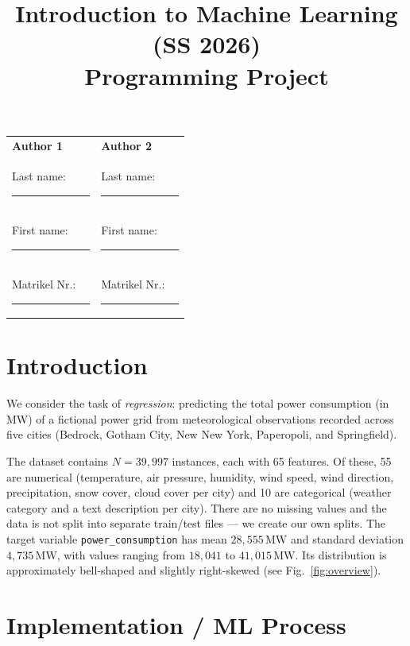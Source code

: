 \documentclass[a4, 10pt, conference]{ieeeconf}
\title{\LARGE \bf
Introduction to Machine Learning (SS 2026)\\ Programming Project
\vspace{-3em}
}
\begin{document}
\maketitle
\vspace{-3em}
\thispagestyle{empty}
\pagestyle{empty}

\begin{center}
\begin{tabular}{|p{0.42\linewidth}|p{0.42\linewidth}|}
\hline
\textbf{Author 1} & \textbf{Author 2} \\
Last name:  \rule{2.2cm}{0.4pt}  & Last name:  \rule{2.2cm}{0.4pt} \\
First name: \rule{2.2cm}{0.4pt}  & First name: \rule{2.2cm}{0.4pt} \\
Matrikel Nr.: \rule{2cm}{0.4pt}  & Matrikel Nr.: \rule{2cm}{0.4pt} \\
\hline
\end{tabular}
\end{center}


\section{Introduction}
\label{sec:intro}

We consider the task of \emph{regression}: predicting the total power consumption (in MW) of a fictional power grid from meteorological observations recorded across five cities (Bedrock, Gotham City, New New York, Paperopoli, and Springfield).

The dataset contains $N = 39{,}997$ instances, each with 65 features. Of these, 55 are numerical (temperature, air pressure, humidity, wind speed, wind direction, precipitation, snow cover, cloud cover per city) and 10 are categorical (weather category and a text description per city). There are no missing values and the data is not split into separate train/test files — we create our own splits. The target variable \texttt{power\_consumption} has mean $28{,}555\,\text{MW}$ and standard deviation $4{,}735\,\text{MW}$, with values ranging from $18{,}041$ to $41{,}015\,\text{MW}$. Its distribution is approximately bell-shaped and slightly right-skewed (see Fig.~\ref{fig:overview}).

\section{Implementation / ML Process}
\label{sec:methods}
\end{document}
